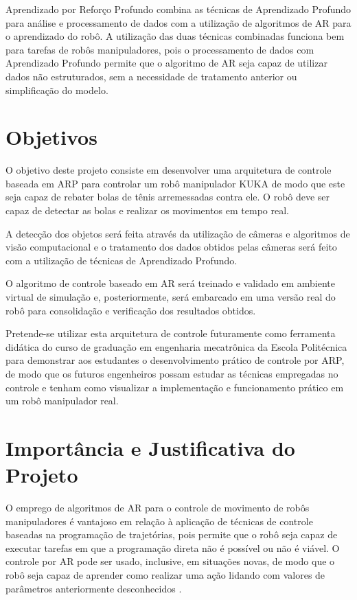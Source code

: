 \documentclass[]{politex}
\begin{document}
	Aprendizado por Reforço Profundo combina as técnicas de Aprendizado Profundo para análise e processamento de dados com a utilização de algoritmos de AR para o aprendizado do robô. A utilização das duas técnicas combinadas funciona bem para tarefas de robôs manipuladores, pois o processamento de dados com Aprendizado Profundo permite que o algoritmo de AR seja capaz de utilizar dados não estruturados, sem a necessidade de tratamento anterior ou simplificação do modelo.
	
	
\section{Objetivos}
	O objetivo deste projeto consiste em desenvolver uma arquitetura de controle baseada em ARP para controlar um robô manipulador KUKA de modo que este seja capaz de rebater bolas de tênis arremessadas contra ele. O robô deve ser capaz de detectar as bolas e realizar os movimentos em tempo real.
	
	A detecção dos objetos será feita através da utilização de câmeras e algoritmos de visão computacional e o tratamento dos dados obtidos pelas câmeras será feito com a utilização de técnicas de Aprendizado Profundo.
	
	O algoritmo de controle baseado em AR será treinado e validado em ambiente virtual de simulação e, posteriormente, será embarcado em uma versão real do robô para consolidação e verificação dos resultados obtidos.
	
	Pretende-se utilizar esta arquitetura de controle futuramente como ferramenta didática do curso de graduação em engenharia mecatrônica da Escola Politécnica para demonstrar aos estudantes o desenvolvimento prático de controle por ARP, de modo que os futuros engenheiros possam estudar as técnicas empregadas no controle e tenham como visualizar a implementação e funcionamento prático em um robô manipulador real.

\section{Importância e Justificativa do Projeto}
	
	O emprego de algoritmos de AR para o controle de movimento de robôs manipuladores é vantajoso em relação à aplicação de técnicas de controle baseadas na programação de trajetórias, pois permite que o robô seja capaz de executar tarefas em que a programação direta não é possível ou não é viável. O controle por AR pode ser usado, inclusive, em situações novas, de modo que o robô seja capaz de aprender como realizar uma ação lidando com valores de parâmetros anteriormente desconhecidos \cite{kormushev2013reinforcement} .
	
\end{document}
